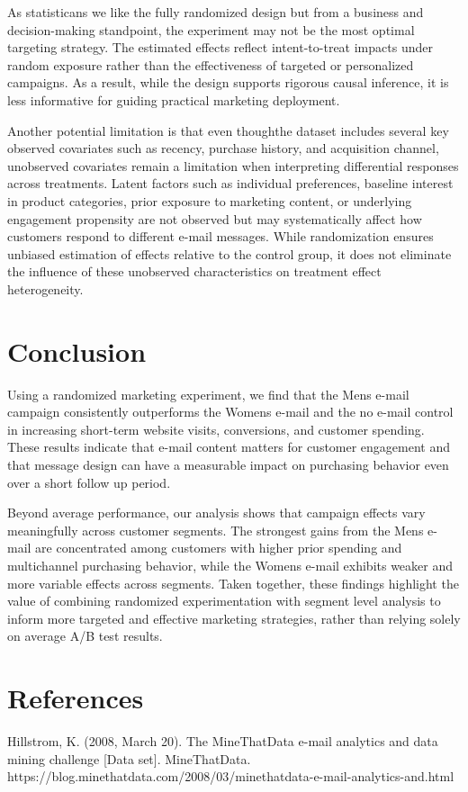 \documentclass[10pt]{article}
\begin{document}
As statisticans we like the fully randomized design but from a business and decision-making standpoint, the experiment may not be the most optimal targeting strategy. The estimated effects reflect intent-to-treat impacts under random exposure rather than the effectiveness of targeted or personalized campaigns. As a result, while the design supports rigorous causal inference, it is less informative for guiding practical marketing deployment.

Another potential limitation is that even thoughthe dataset includes several key observed covariates such as recency, purchase history, and acquisition channel, unobserved covariates remain a limitation when interpreting differential responses across treatments. Latent factors such as individual preferences, baseline interest in product categories, prior exposure to marketing content, or underlying engagement propensity are not observed but may systematically affect how customers respond to different e-mail messages. While randomization ensures unbiased estimation of effects relative to the control group, it does not eliminate the influence of these unobserved characteristics on treatment effect heterogeneity.

\section{Conclusion}

Using a randomized marketing experiment, we find that the Mens e-mail campaign consistently outperforms the Womens e-mail and the no e-mail control in increasing short-term website visits, conversions, and customer spending. These results indicate that e-mail content matters for customer engagement and that message design can have a measurable impact on purchasing behavior even over a short follow up period.

Beyond average performance, our analysis shows that campaign effects vary meaningfully across customer segments. The strongest gains from the Mens e-mail are concentrated among customers with higher prior spending and multichannel purchasing behavior, while the Womens e-mail exhibits weaker and more variable effects across segments. Taken together, these findings highlight the value of combining randomized experimentation with segment level analysis to inform more targeted and effective marketing strategies, rather than relying solely on average A/B test results.




\section{References}
Hillstrom, K. (2008, March 20). The MineThatData e-mail analytics and data mining challenge [Data set]. MineThatData. https://blog.minethatdata.com/2008/03/minethatdata-e-mail-analytics-and.html
\end{document}
